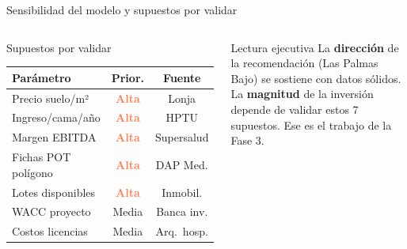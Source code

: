 \documentclass[aspectratio=169, 11pt]{beamer}
\newcommand{\danger}[1]{\textcolor{coral}{\textbf{#1}}}
\begin{document}
{\begin{frame}{Sensibilidad del modelo y supuestos por validar}
\begin{columns}[T]
\begin{alertblock}{\small Supuestos por validar}
\scriptsize
\begin{tabular}{@{}p{2.8cm}cc@{}}
\toprule
\textbf{Parámetro} & \textbf{Prior.} & \textbf{Fuente} \\
\midrule
\rowcolor{coral!8}
Precio suelo/m² & \danger{Alta} & Lonja \\
\rowcolor{coral!8}
Ingreso/cama/año & \danger{Alta} & HPTU \\
\rowcolor{coral!6}
Margen EBITDA & \danger{Alta} & Supersalud \\
Fichas POT polígono & \danger{Alta} & DAP Med. \\
Lotes disponibles & \danger{Alta} & Inmobil. \\
\rowcolor{amber!10}
WACC proyecto & Media & Banca inv. \\
\rowcolor{amber!10}
Costos licencias & Media & Arq.\ hosp. \\
\bottomrule
\end{tabular}
\end{alertblock}

\vspace{3pt}
\begin{exampleblock}{\small Lectura ejecutiva}
\scriptsize La \textbf{dirección} de la recomendación (Las Palmas Bajo) se sostiene con datos sólidos. La \textbf{magnitud} de la inversión depende de validar estos 7 supuestos. Ese es el trabajo de la Fase 3.
\end{exampleblock}
\end{columns}
\end{frame}
}
\end{document}
